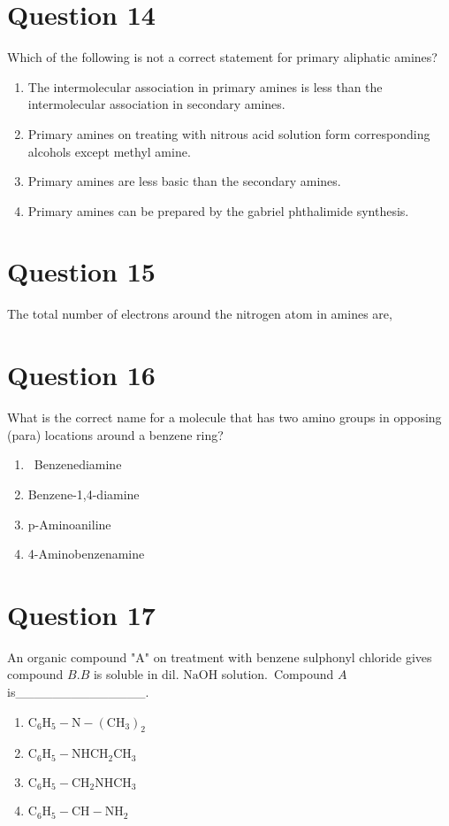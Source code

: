 \documentclass{article}
\begin{document}
\section*{Question 14}
Which of the following is not a correct statement for primary aliphatic amines? 
\begin{enumerate}[label=(\alph*)]
\item The intermolecular association in primary amines is less than the intermolecular association in secondary amines.
\item Primary amines on treating with nitrous acid solution form corresponding alcohols except methyl amine.
\item Primary amines are less basic than the secondary amines.
\item Primary amines can be prepared by the gabriel phthalimide synthesis.
\end{enumerate}
\newpage
\section*{Question 15}
The total number of electrons around the nitrogen atom in amines are, 
\begin{enumerate}[label=(\alph*)]
\end{enumerate}
\newpage
\section*{Question 16}
What is the correct name for a molecule that has two amino groups in opposing (para) locations around a benzene ring?
\begin{enumerate}[label=(\alph*)]
\item  Benzenediamine
\item Benzene-1,4-diamine
\item p-Aminoaniline
\item 4-Aminobenzenamine
\end{enumerate}
\newpage
\section*{Question 17}
An organic compound "A" on treatment with benzene sulphonyl chloride gives compound \(B . B\) is soluble in dil. \(\mathrm{NaOH}\) solution. Compound \(A\) is______________. 
\begin{enumerate}[label=(\alph*)]
\item \(\mathrm{C}_6 \mathrm{H}_5-\mathrm{N}-\left(\mathrm{CH}_3\right)_2\)
\item \(\mathrm{C}_6 \mathrm{H}_5-\mathrm{NHCH}_2 \mathrm{CH}_3\)
\item \(\mathrm{C}_6 \mathrm{H}_5-\mathrm{CH}_2 \mathrm{NHCH}_3\)
\item \(\mathrm{C}_6 \mathrm{H}_5-\mathrm{CH}-\mathrm{NH}_2\)
\end{enumerate}
\newpage
\end{document}
